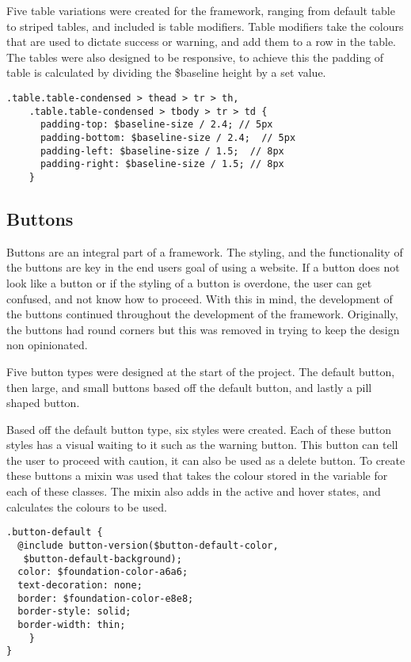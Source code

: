 Five table variations were created for the framework, ranging from default table to striped tables, and included is table modifiers. Table modifiers take the colours that are used to dictate success or warning, and add them to a row in the table. The tables were also designed to be responsive, to achieve this the padding of table is calculated by dividing the \$baseline height by a set value. 

\newpage
\begin{lstlisting}[language=CSS3]
    .table.table-condensed > thead > tr > th,
    .table.table-condensed > tbody > tr > td {
      padding-top: $baseline-size / 2.4; // 5px
      padding-bottom: $baseline-size / 2.4;  // 5px
      padding-left: $baseline-size / 1.5;  // 8px
      padding-right: $baseline-size / 1.5; // 8px
    }
\end{lstlisting}


\subsection*{Buttons}
Buttons are an integral part of a framework. The styling, and the functionality of the buttons are key in the end users goal of using a website. If a button does not look like a button or if the styling of a button is overdone, the user can get confused, and not know how to proceed. With this in mind, the development of the buttons continued throughout the development of the framework. Originally, the buttons had round corners but this was removed in trying to keep the design non opinionated. 

Five button types were designed at the start of the project. The default button, then large, and small buttons based off the default button, and lastly a pill shaped button. 

Based off the default button type, six styles were created. Each of these button styles has a visual waiting to it such as the warning button. This button can tell the user to proceed with caution, it can also be used as a delete button. To create these buttons a mixin was used that takes the colour stored in the variable for each of these classes. The mixin also adds in the active and hover states, and calculates the colours to be used. 

\newpage
\begin{lstlisting}[language=CSS3]
.button-default {
  @include button-version($button-default-color,
   $button-default-background);
  color: $foundation-color-a6a6;
  text-decoration: none;
  border: $foundation-color-e8e8;
  border-style: solid;
  border-width: thin;
	}
}
\end{lstlisting}

